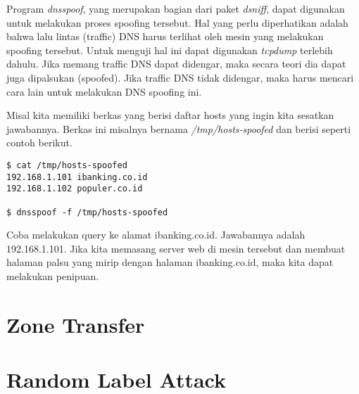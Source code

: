 Program {\em dnsspoof}, yang merupakan bagian dari paket {\em dsniff}, dapat
digunakan untuk melakukan proses spoofing tersebut. Hal yang perlu diperhatikan
adalah bahwa lalu lintas (traffic) DNS harus terlihat oleh mesin yang melakukan
spoofing tersebut. Untuk menguji hal ini dapat digunakan {\em tcpdump} terlebih
dahulu. Jika memang traffic DNS dapat didengar, maka secara teori dia dapat
juga dipalsukan (spoofed). Jika traffic DNS tidak didengar, maka harus mencari
cara lain untuk melakukan DNS spoofing ini.

Misal kita memiliki berkas yang berisi daftar hosts yang ingin kita sesatkan
jawabannya. Berkas ini misalnya bernama {\em /tmp/hosts-spoofed} dan berisi
seperti contoh berikut.

\begin{verbatim}
$ cat /tmp/hosts-spoofed
192.168.1.101 ibanking.co.id
192.168.1.102 populer.co.id

$ dnsspoof -f /tmp/hosts-spoofed
\end{verbatim}

Coba melakukan query ke alamat ibanking.co.id. Jawabannya adalah 192.168.1.101.
Jika kita memasang server web di mesin tersebut dan membuat halaman palsu yang
mirip dengan halaman ibanking.co.id, maka kita dapat melakukan penipuan.

\section{Zone Transfer}

\section{Random Label Attack}
